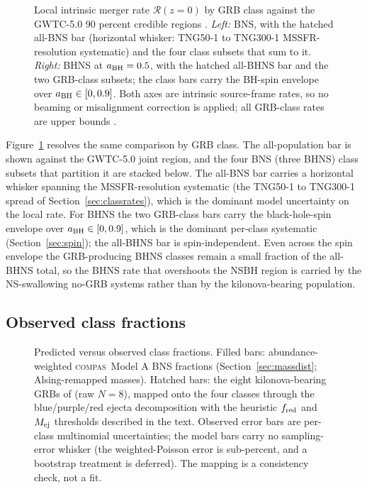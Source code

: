 \documentclass[twocolumn,amsmath]{aastex702}
\newcommand{\compas}{\textsc{compas}}
\newcommand{\Rzero}{\mathcal{R}(z{=}0)}
\newcommand{\aBH}{a_{\rm BH}}
\begin{document}
\begin{figure}[tbp]
\caption{Local intrinsic merger rate $\Rzero$ by GRB class against the GWTC-5.0
90 percent credible regions \citep[shaded]{abac2026}. \textit{Left:} BNS, with
the hatched all-BNS bar (horizontal whisker: TNG50-1 to TNG300-1 MSSFR-resolution
systematic) and the four \citet{gottlieb2024} class subsets that sum to it.
\textit{Right:} BHNS at $\aBH = 0.5$, with the hatched all-BHNS bar and the two
GRB-class subsets; the class bars carry the BH-spin envelope over
$\aBH \in [0,0.9]$. Both axes are intrinsic source-frame rates, so no beaming or
misalignment correction is applied; all GRB-class rates are upper bounds
\citep{gottlieb2023}. \label{fig:lvkbars}}
\end{figure}

Figure~\ref{fig:lvkbars} resolves the same comparison by GRB class.
The all-population bar is shown against the GWTC-5.0 joint region, and the
four BNS (three BHNS) class subsets that partition it are stacked below. The
all-BNS bar carries a horizontal whisker spanning the MSSFR-resolution
systematic (the TNG50-1 to TNG300-1 spread of Section~\ref{sec:classrates}),
which is the dominant model uncertainty on the local rate. For BHNS the two
GRB-class bars carry the black-hole-spin envelope over $\aBH \in [0,0.9]$, which
is the dominant per-class systematic (Section~\ref{sec:spin}); the all-BHNS bar
is spin-independent. Even across the spin envelope the GRB-producing BHNS classes
remain a small fraction of the all-BHNS total, so the BHNS rate that overshoots
the NSBH region is carried by the NS-swallowing no-GRB systems rather than by the
kilonova-bearing population.

\subsection{Observed class fractions} \label{sec:obsclass}

\begin{figure}[tbp]
\caption{Predicted versus observed \citet{gottlieb2024} class fractions. Filled
bars: abundance-weighted \compas\ Model A BNS fractions (Section~\ref{sec:massdist};
Alsing-remapped masses). Hatched bars: the eight kilonova-bearing GRBs of
\citet{rastinejad2024} (raw $N = 8$), mapped onto the four classes
through the blue/purple/red ejecta decomposition with the heuristic
$f_{\rm red}$ and $M_{\rm ej}$ thresholds described in the text. Observed error
bars are per-class multinomial uncertainties; the model bars carry no
sampling-error whisker (the weighted-Poisson error is sub-percent, and a
bootstrap treatment is deferred). The mapping is a consistency
check, not a fit. \label{fig:obsclass}}
\end{figure}
\end{document}
